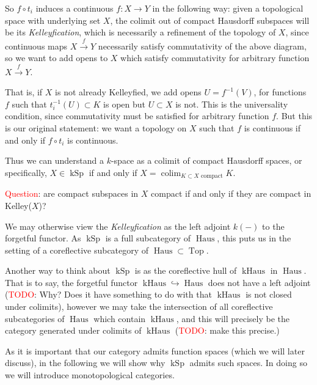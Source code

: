 \documentclass[12pt,a4paper]{article}
\DeclareMathOperator{\colim}{colim}
\DeclareMathOperator{\Top}{Top}
\DeclareMathOperator{\kSp}{kSp}
\DeclareMathOperator{\kHaus}{kHaus}
\DeclareMathOperator{\Haus}{Haus}
\begin{document}
So $f \circ t_i$ induces a continuous $f: X \to Y$ in the following way: given a topological space with underlying set  $X$, the colimit out of compact Hausdorff subspaces will be its \emph{Kelleyfication}, which is necessarily a refinement of the topology of $X$, since continuous maps $X \stackrel{f}{\to}Y$ necessarily satisfy commutativity of the above diagram, so we want to add opens to $X$ which satisfy commutativity for arbitrary function $X \stackrel{f}{\to}Y$. 



That is, if $X$ is not already Kelleyfied, we add opens $U = f^{-1}(V)$, for functions $f$ such that  $t_i^{-1}(U) \subset K$ is open  but $U \subset X$ is not. This is the universality condition, since commutativity must be satisfied for arbitrary function $f$. But this is our original statement: we want a topology on $X$ such that $f$ is continuous if and only if $f \circ t_i$ is continuous. 

Thus we can understand a $k$-space as a colimit of compact Hausdorff spaces, or specifically, $X \in \kSp$ if and only if $X = \colim_{K \subset X \text{ compact}}K$.

\textcolor{red}{Question}: are compact subspaces in $X$ compact if and only if they are compact in Kelley($X$)?

We may otherwise view the \emph{Kelleyfication} as the left adjoint $k(-)$ to the forgetful functor. As $\kSp$ is a full subcategory of $\Haus$, this puts us in the setting of a coreflective subcategory of $\Haus \subset \Top$. 

Another way to think about $\kSp$ is as the coreflective hull of $\kHaus$ in $\Haus$. That is to say, the forgetful functor $\kHaus \hookrightarrow \Haus$ does not have a left adjoint (\textcolor{red}{TODO}: Why? Does it have something to do with that $\kHaus$ is not closed under colimits), however we may take the intersection of all coreflective subcategories of $\Haus$ which contain $\kHaus$, and this will precisely be the category generated under colimits of $\kHaus$  (\textcolor{red}{TODO}: make this precise.)



As it is important that our category admits function spaces (which we will later discuss), in the following we will show why $\kSp$ admits such spaces. In doing so we will introduce monotopological categories. 
\end{document}
